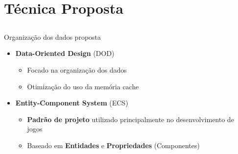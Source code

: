 \section{Técnica Proposta}
\subsection*{}



\begin{frame}{Organização dos dados proposta}

    \vspace{1cm}

    \begin{itemize}
        \item \textbf{Data-Oriented Design} (DOD)
        \begin{itemize}
            \item Focado na organização dos dados
            \item Otimização do uso da memória cache
        \end{itemize}
        \item \textbf{Entity-Component System} (ECS)
        \begin{itemize}
            \item \textbf{Padrão de projeto} utilizado principalmente no desenvolvimento de jogos
            \item Baseado em \textbf{Entidades} e \textbf{Propriedades} (Componentes)
        \end{itemize}
    \end{itemize}


    \begin{center}
    \end{center}

\end{frame}

